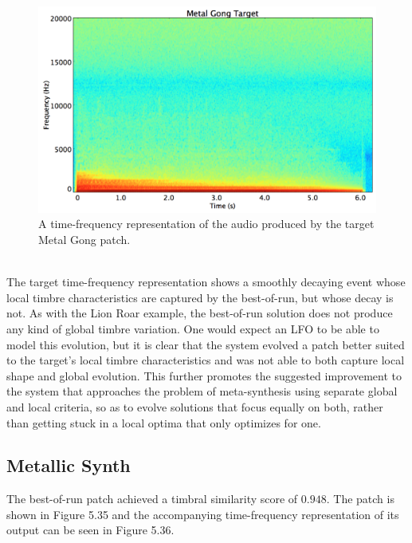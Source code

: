 \documentclass[12pt]{report} 	%
\numberwithin{figure}{chapter}
\numberwithin{table}{chapter}
\numberwithin{equation}{chapter}
\begin{document}
\begin{flushleft}
\begin{figure}[h!]
\begin{center}
\includegraphics[scale=0.35,width=\linewidth]{MetalGongTargetSTFT}
\caption[Target metal gong time-frequency representation]{A time-frequency representation of the audio produced by the target Metal Gong patch.}
\end{center}
\end{figure}
\\
The target time-frequency representation shows a smoothly decaying event whose local timbre characteristics are captured by the best-of-run, but whose decay is not. As with the Lion Roar example, the best-of-run solution does not produce any kind of global timbre variation. One would expect an LFO to be able to model this evolution, but it is clear that the system evolved a patch better suited to the target's local timbre characteristics and was not able to both capture local shape and global evolution. This further promotes the suggested improvement to the system that approaches the problem of meta-synthesis using separate global and local criteria, so as to evolve solutions that focus equally on both, rather than getting stuck in a local optima that only optimizes for one.

\clearpage
\subsection{Metallic Synth}

The best-of-run patch achieved a timbral similarity score of $0.948$. The patch is shown in Figure 5.35 and the accompanying time-frequency representation of its output can be seen in Figure 5.36.


\end{flushleft}
\end{document}
